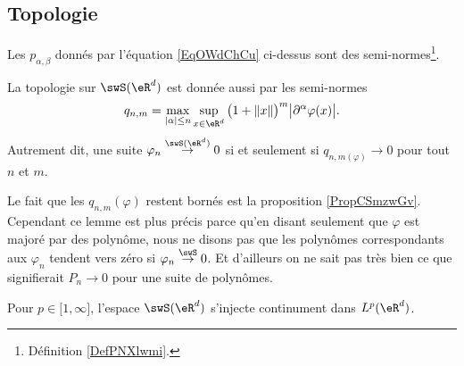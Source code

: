 \subsection{Topologie}

\begin{lemma}
    Les \( p_{\alpha,\beta}\) donnés par l'équation \eqref{EqOWdChCu} ci-dessus sont des semi-normes\footnote{Définition \ref{DefPNXlwmi}.}.
\end{lemma}

\begin{lemma}   \label{LemRJhCbkO}
    La topologie sur \( \swS(\eR^d)\) est donnée aussi par les semi-normes
    \begin{equation}
        q_{n,m}=\max_{| \alpha |\leq n}\sup_{x\in \eR^d}\big( 1+\| x \| \big)^m\big| \partial^{\alpha}\varphi(x) \big|.
    \end{equation}
    Autrement dit, une suite \( \varphi_n\stackrel{\swS(\eR^d)}{\to}0\) si et seulement si \( q_{n,m(\varphi)}\to 0\) pour tout \( n\) et \( m\).
\end{lemma}
Le fait que les \( q_{n,m}(\varphi)\) restent bornés est la proposition \ref{PropCSmzwGv}. Cependant ce lemme est plus précis parce qu'en disant seulement que \( \varphi\) est majoré par des polynôme, nous ne disons pas que les polynômes correspondants aux \( \varphi_n\) tendent vers zéro si \( \varphi_n\stackrel{\swS}{\to}0\). Et d'ailleurs on ne sait pas très bien ce que signifierait \( P_n\to 0\) pour une suite de polynômes.

\begin{proposition}     \label{PropGNXBeME}
    Pour \( p\in\mathopen[ 1 , \infty \mathclose]\), l'espace \( \swS(\eR^d)\) s'injecte continument dans \( L^p(\eR^d)\). 
\end{proposition}

